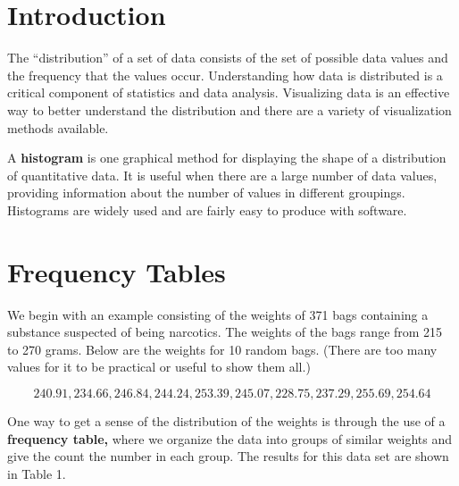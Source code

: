 \documentclass[
]{book}
\begin{document}
\hypertarget{introduction-1}{%
\section{Introduction}\label{introduction-1}}

The ``distribution'' of a set of data consists of the set of possible data values and the
frequency that the values occur. Understanding how data is distributed is a
critical component of statistics and data analysis. Visualizing data is an
effective way to better understand the distribution and there are a variety
of visualization methods available.

A \textbf{histogram} is one graphical method for displaying the shape of a distribution
of quantitative data.
It is useful when there are a large number of data values, providing information
about the number of values in different groupings. Histograms are widely used
and are fairly easy to produce with software.

\hypertarget{frequency-tables-1}{%
\section{Frequency Tables}\label{frequency-tables-1}}

We begin with an example consisting of the weights of 371 bags containing a
substance suspected of being narcotics. The weights of the bags range from
215 to 270 grams. Below are the weights for 10 random bags. (There are too many
values for it to be practical or useful to show them all.)

\[
240.91, 234.66, 246.84, 244.24, 253.39, 245.07, 228.75, 237.29, 255.69, 254.64
\]

One way to get a sense of the distribution of the weights is through the
use of a \textbf{frequency table,} where we organize the data into groups of similar
weights and give the count the number in each group. The results for this
data set are shown in Table 1.
\end{document}
